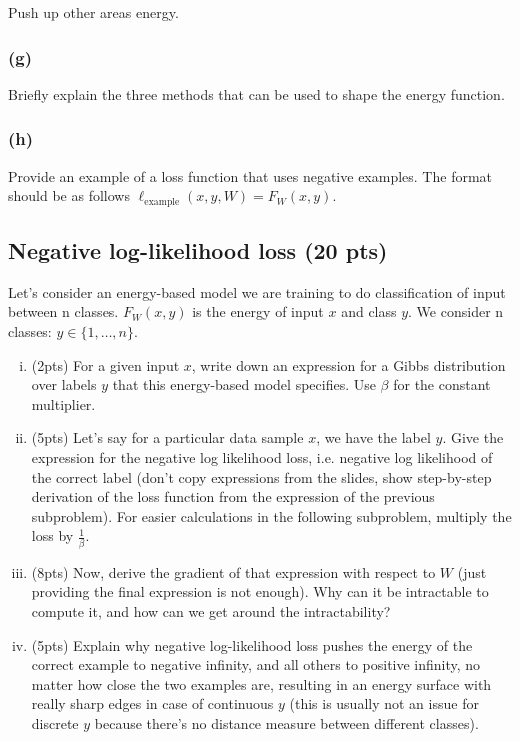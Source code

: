 Push up other areas energy.



\subsubsection*{(g)}
Briefly explain the three methods that can be used to shape the energy function.


\subsubsection*{(h)}
Provide an example of a loss function that uses negative examples. The format should be as follows $\ell_\text{example}(x, y, W) = F_W(x, y)$.




\subsection{Negative log-likelihood loss (20 pts) }

Let's consider an energy-based model we are training to do classification of input between n classes. $F_W(x, y)$ is the energy of input $x$ and class $y$. We consider n classes: $y \in \{1, \dots, n\}$.

\begin{enumerate}[(i)]
\item (2pts) For a given input $x$, write down an expression for a Gibbs distribution over labels $y$ that this energy-based model specifies. Use $\beta$ for the constant multiplier.
 
\item (5pts) Let's say for a particular data sample $x$, we have the label $y$. Give the expression for the negative log likelihood loss, i.e. negative log likelihood of the correct label (don't copy expressions from the slides, show step-by-step derivation of the loss function from the expression of the previous subproblem). For easier calculations in the following subproblem, multiply the loss by $\frac{1}{\beta}$.

\item (8pts) Now, derive the gradient of that expression with respect to $W$ (just providing the final expression is not enough). Why can it be intractable to compute it, and how can we get around the intractability? 

\item (5pts) Explain why negative log-likelihood loss pushes the energy of the correct example to negative infinity, and all others to positive infinity, no matter how close the two examples are, resulting in an energy surface with really sharp edges in case of continuous $y$ (this is usually not an issue for discrete $y$ because there's no distance measure between different classes).

\end{enumerate}

